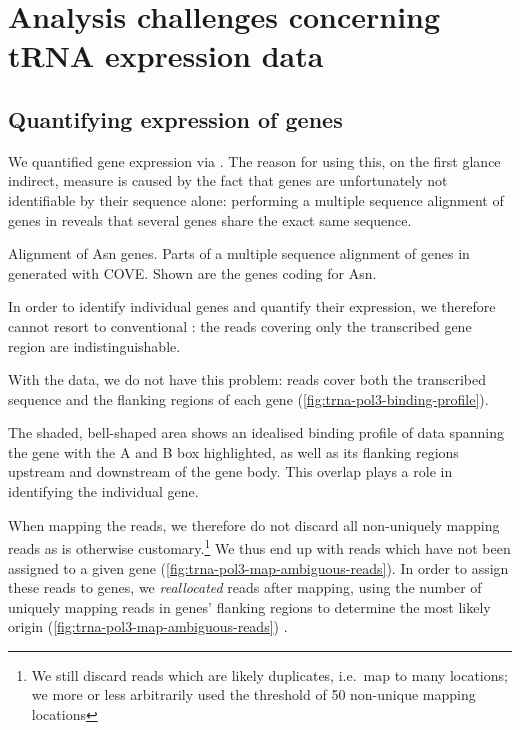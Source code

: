 \chapter{Analysis challenges concerning tRNA expression data}

\section{Quantifying expression of \trna genes}

We quantified \trna gene expression via  \chipseq. The reason for using
this, on the first glance indirect, measure is caused by the fact that \trna
genes are unfortunately not identifiable by their sequence alone: performing a
multiple sequence alignment of \trna genes in \mmu reveals that several \trna
genes share the exact same sequence.

    {{\footnotesize}}
    {Alignment of Asn \trna genes.}
    {Parts of a multiple sequence alignment of \trna genes in \mmu generated
    with COVE\@. Shown are the \trna genes coding for Asn.}

In order to identify individual \trna genes and quantify their expression, we
therefore cannot resort to conventional \rnaseq: the \rna reads covering only
the transcribed gene region are indistinguishable.

With the  \chipseq data, we do not have this problem: reads cover both the
transcribed sequence and the flanking regions of each gene
(\cref{fig:trna-pol3-binding-profile}).

    {The shaded, bell-shaped area shows an idealised binding profile of \chipseq
    data spanning the \trna gene with the A and B box highlighted, as well as
    its flanking regions upstream and downstream of the gene body. This overlap
    plays a role in identifying the individual gene.}

When mapping the reads, we therefore do not discard all non-uniquely mapping
reads as is otherwise customary.\footnote{We still discard reads which are
likely \pcr duplicates, i.e.\ map to many locations; we more or less arbitrarily
used the threshold of \num{50} non-unique mapping locations} We thus end up with
reads which have not been assigned to a given \trna gene
(\cref{fig:trna-pol3-map-ambiguous-reads}). In order to assign these reads to
\trna genes, we \emph{reallocated} reads after mapping, using the number of
uniquely mapping reads in \trna genes’ flanking regions to determine the most
likely origin (\cref{fig:trna-pol3-map-ambiguous-reads}) \citep{Kutter:2011}.


